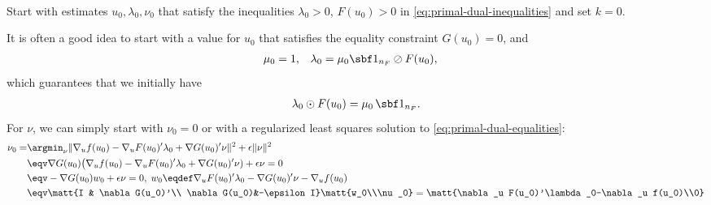 \documentclass[11pt]{article}
\begin{document}
\begin{algorithm}~\label{al:primal-dual-o}
\begin{steps}
\item Start with estimates $u_0,\lambda_0,\nu_0$ that satisfy the inequalities
  $\lambda_0>0$, $F(u_0)> 0$ in \eqref{eq:primal-dual-inequalities}
  and set $k=0$.

  It is often a good idea to start with a value for $u_0$ that
  satisfies the equality constraint $G(u_0)=0$, and
  \begin{align*}
    \mu_0&=1, &
    \lambda_0&=\mu_0\sbf 1_{n_F}\oslash F(u_0),
  \end{align*}
  which guarantees that we initially have
  \begin{align*}
    \lambda_0\odot F(u_0)=\mu_0\,\sbf 1_{n_F}.
  \end{align*}
  For $\nu$, we can simply start with $\nu_0=0$ or with a regularized least
  squares solution to \eqref{eq:primal-dual-equalities}:
  \begin{align*}
    \nu_0=&\argmin_\nu \|\nabla_u f(u_0)-\nabla_u F(u_0)'\lambda_0+\nabla G(u_0)'\nu\|^2+\epsilon\|\nu\|^2\\
    &\eqv \nabla G(u_0)\big(\nabla_u f(u_0)-\nabla_u F(u_0)'\lambda_0+\nabla G(u_0)'\nu)+\epsilon\nu=0\\
    &\eqv -\nabla G(u_0) w_0+\epsilon\nu=0,\; w_0\eqdef\nabla_u F(u_0)'\lambda_0-\nabla G(u_0)'\nu-\nabla_u f(u_0)\\
    &\eqv \matt{I & \nabla G(u_0)'\\ \nabla G(u_0)&-\epsilon I}\matt{w_0\\\nu_0}=\matt{\nabla_u F(u_0)'\lambda_0-\nabla_u f(u_0)\\0}
  \end{align*}


\end{steps}
\end{algorithm}
\end{document}
